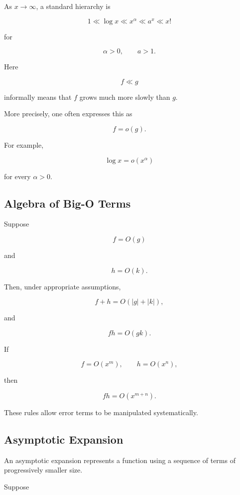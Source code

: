 As \(x\to\infty\), a standard hierarchy is

\[
\boxed{
1
\ll
\log x
\ll
x^\alpha
\ll
a^x
\ll
x!
}
\]

for

\[
\alpha>0,
\qquad
a>1.
\]

Here

\[
f\ll g
\]

informally means that \(f\) grows much more slowly than \(g\).

More precisely, one often expresses this as

\[
\boxed{
f=o(g).
}
\]

For example,

\[
\boxed{
\log x=o(x^\alpha)
}
\]

for every \(\alpha>0\).

\subsection{Algebra of Big-O Terms}
\label{subsec:big-o-algebra}

Suppose

\[
f=O(g)
\]

and

\[
h=O(k).
\]

Then, under appropriate assumptions,

\[
\boxed{
f+h
=
O(|g|+|k|),
}
\]

and

\[
\boxed{
fh
=
O(gk).
}
\]

If

\[
f=O(x^m),
\qquad
h=O(x^n),
\]

then

\[
\boxed{
fh=O(x^{m+n}).
}
\]

These rules allow error terms to be manipulated systematically.

\subsection{Asymptotic Expansion}
\label{subsec:asymptotic-expansion}

An asymptotic expansion represents a function using a sequence of terms
of progressively smaller size.

Suppose

